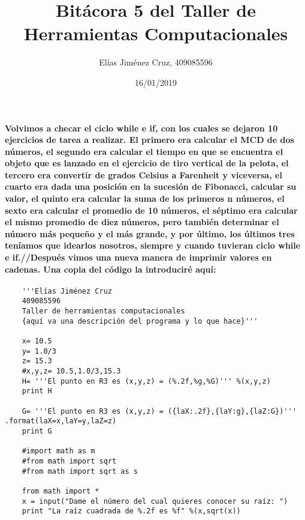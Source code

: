\documentclass[letterpaper, 12pt, oneside]{article} %
\title{\Huge Bitácora 5 del Taller de Herramientas Computacionales}
\author{Elías Jiménez Cruz, 409085596}
\date{16/01/2019}
\begin{document}
	\maketitle
	\paragraph{Volvimos a checar el ciclo while e if, con los cuales se dejaron 10 ejercicios de tarea a realizar. El primero era calcular el MCD de dos números, el segundo era calcular el tiempo en que se encuentra el objeto que es lanzado en el ejercicio de tiro vertical de la pelota, el tercero era convertir de grados Celsius a Farenheit y viceversa, el cuarto era dada una posición en la sucesión de Fibonacci, calcular su valor, el quinto era calcular la suma de los primeros n números, el sexto era calcular el promedio de 10 números, el séptimo era calcular el mismo promedio de diez números, pero también determinar el número más pequeño y el más grande, y por último, los últimos tres teníamos que idearlos nosotros, siempre y cuando tuvieran ciclo while e if.//Después vimos una nueva manera de imprimir valores en cadenas. Una copia del código la introduciré aquí:}
	\begin{verbatim}
	'''Elías Jiménez Cruz
	409085596
	Taller de herramientas computacionales
	{aquí va una descripción del programa y lo que hace}'''
	
	x= 10.5
	y= 1.0/3
	z= 15.3
	#x,y,z= 10.5,1.0/3,15.3
	H= '''El punto en R3 es (x,y,z) = (%.2f,%g,%G)''' %(x,y,z)
	print H
	
	G= '''El punto en R3 es (x,y,z) = ({laX:.2f},{laY:g},{laZ:G})''' .format(laX=x,laY=y,laZ=z)
	print G
	
	#import math as m
	#from math import sqrt
	#from math import sqrt as s
	
	from math import *
	x = input("Dame el número del cual quieres conocer su raíz: ")
	print "La raíz cuadrada de %.2f es %f" %(x,sqrt(x))
	\end{verbatim}
\end{document}
